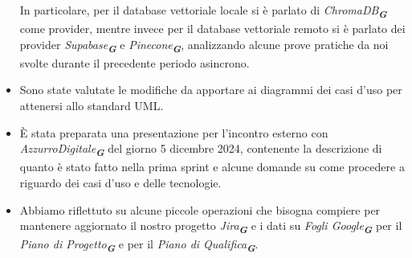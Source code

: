 \begin{itemize}
\begin{itemize}
\begin{itemize}
        \end{itemize}
    \end{itemize}
    In particolare, per il database vettoriale locale si è parlato di \emph{ChromaDB}\textsubscript{\textit{\textbf{G}}} come provider, mentre invece per il database
    vettoriale remoto si è parlato dei provider \emph{Supabase}\textsubscript{\textit{\textbf{G}}} e \emph{Pinecone}\textsubscript{\textit{\textbf{G}}},
    analizzando alcune prove pratiche da noi svolte durante il precedente periodo asincrono.
    \item  Sono state valutate le modifiche da apportare ai diagrammi dei casi d'uso per attenersi allo standard UML.
    \item È stata preparata una presentazione per l'incontro esterno con \emph{AzzurroDigitale}\textsubscript{\textit{\textbf{G}}} del giorno 5 dicembre 2024,
    contenente la descrizione di quanto è stato fatto nella prima sprint e alcune domande su come procedere a riguardo dei casi d'uso e delle tecnologie.
    \item Abbiamo riflettuto su alcune piccole operazioni che bisogna compiere per mantenere aggiornato il nostro progetto \emph{Jira}\textsubscript{\textit{\textbf{G}}}
    e i dati su \emph{Fogli Google}\textsubscript{\textit{\textbf{G}}} per il \emph{Piano di Progetto}\textsubscript{\textit{\textbf{G}}} e per il 
    \emph{Piano di Qualifica}\textsubscript{\textit{\textbf{G}}}.
\end{itemize}
